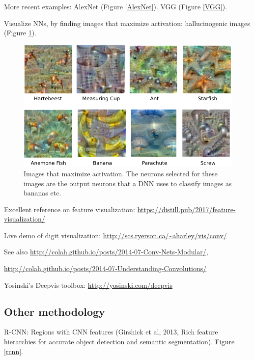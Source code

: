 \documentclass[english]{article}
\begin{document}
More recent examples: AlexNet (Figure \ref{AlexNet}). VGG (Figure \ref{VGG}). 

\item Visualize NNs, by finding images that maximize activation: hallucinogenic images (Figure \ref{vis}).

\begin{figure}
  \centering
  \includegraphics[scale=0.7]{vis.png}
    \caption{Images that maximize activation. The neurons selected for these images are the output neurons that a DNN uses to classify images as bananas etc.}
    \label{vis}
\end{figure}

\item Excellent reference on feature visualization: \url{https://distill.pub/2017/feature-visualization/}

Live demo of digit visualization: \url{http://scs.ryerson.ca/~aharley/vis/conv/}


\item See also \url{http://colah.github.io/posts/2014-07-Conv-Nets-Modular/}, 

\url{http://colah.github.io/posts/2014-07-Understanding-Convolutions/}

Yosinski's Deepvis toolbox: \url{http://yosinski.com/deepvis}
\eenum



\subsection{Other methodology}
\benum
\item R-CNN: Regions with CNN features (Girshick et al, 2013, Rich feature hierarchies for accurate object detection and semantic segmentation). Figure \ref{rcnn}.
\end{document}
